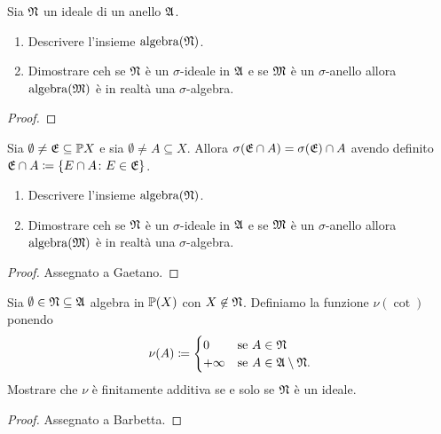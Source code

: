 \documentclass[../EserciziIstituzioniAnalisi.tex]{subfiles}
\begin{document}
\begin{exercise}[13/10/2016]
Sia $\mathfrak N$ un ideale di un anello $\mathfrak A$.
\begin{enumerate}
\item Descrivere l'insieme $\operatorname{algebra}(\mathfrak N)$.
\item Dimostrare ceh se $\mathfrak N$ \`e un $\sigma$-ideale in $\mathfrak A$ e se $\mathfrak M$ \`e un $\sigma$-anello allora $\operatorname{algebra}(\mathfrak M)$ \`e in realt\`a una $\sigma$-algebra.
\end{enumerate}
\end{exercise}
\begin{proof}
\end{proof}

\begin{exercise}[13/10/2016]
Sia $\emptyset \neq \mathfrak E \subseteq \mathbb P{X}$ e sia $\emptyset \neq A \subseteq X$.
Allora $\sigma(\mathfrak E \cap A) = \sigma(\mathfrak E) \cap A$ avendo definito $\mathfrak E \cap A \coloneqq \left\lbrace E \cap A \colon E \in \mathfrak E\right\rbrace$.
\begin{enumerate}
\item Descrivere l'insieme $\operatorname{algebra}(\mathfrak N)$.
\item Dimostrare ceh se $\mathfrak N$ \`e un $\sigma$-ideale in $\mathfrak A$ e se $\mathfrak M$ \`e un $\sigma$-anello allora $\operatorname{algebra}(\mathfrak M)$ \`e in realt\`a una $\sigma$-algebra.
\end{enumerate}
\end{exercise}
\begin{proof}
Assegnato a Gaetano.
\end{proof}

\begin{exercise}[13/10/2016]
  Sia $\emptyset \in \mathfrak N \subseteq \mathfrak A$ algebra in $\mathbb P(X)$ con $X \not\in \mathfrak N$.
  Definiamo la funzione $\nu(\cot)$ ponendo 
  \begin{equation*}
    \nu(A) \coloneqq
    \begin{cases}
      0 & \text{se $A \in \mathfrak N$}\\
      +\infty & \text{se $A \in \mathfrak A\setminus \mathfrak N$}.
    \end{cases}
  \end{equation*}
  Mostrare che $\nu$ \`e finitamente additiva se e solo se $\mathfrak N$ \`e un ideale.
\end{exercise}
\begin{proof}
Assegnato a Barbetta.
\end{proof}
\end{document}
